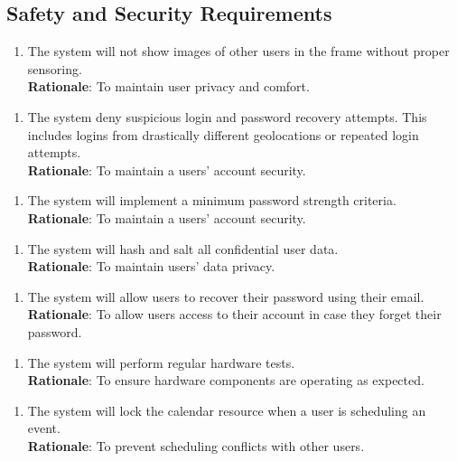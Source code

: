 \documentclass{article}
\begin{document}
\subsection{Safety and Security Requirements}
\begin{enumerate}[{SR}1. ]
    \item The system will not show images of other users in the frame without proper sensoring.\\
    \textbf{Rationale}: To maintain user privacy and comfort. 
\end{enumerate} 
\begin{enumerate}[{SR}Mag2. ]
    \item The system deny suspicious login and password recovery attempts. This includes logins from drastically different geolocations or repeated login attempts.\\
    \textbf{Rationale}: To maintain a users' account security. 
\end{enumerate} 
\begin{enumerate}[{SR}Mag3. ]
    \item The system will implement a minimum password strength criteria.\\
    \textbf{Rationale}: To maintain a users' account security. 
\end{enumerate} 
\begin{enumerate}[{SR}Mag4. ]
    \item The system will hash and salt all confidential user data.\\
    \textbf{Rationale}: To maintain users' data privacy. 
\end{enumerate} 
\begin{enumerate}[{SR}Mag5. ]
    \item The system will allow users to recover their password using their email.\\
    \textbf{Rationale}: To allow users access to their account in case they forget their password. 
\end{enumerate} 
\begin{enumerate}[{SR}Jan1. ]
    \item The system will perform regular hardware tests.\\
    \textbf{Rationale}: To ensure hardware components are operating as expected.
\end{enumerate} 
\begin{enumerate}[{SR}Jan2. ]
    \item The system will lock the calendar resource when a user is scheduling an event.\\
    \textbf{Rationale}: To prevent scheduling conflicts with other users.
\end{enumerate} 
\end{document}
